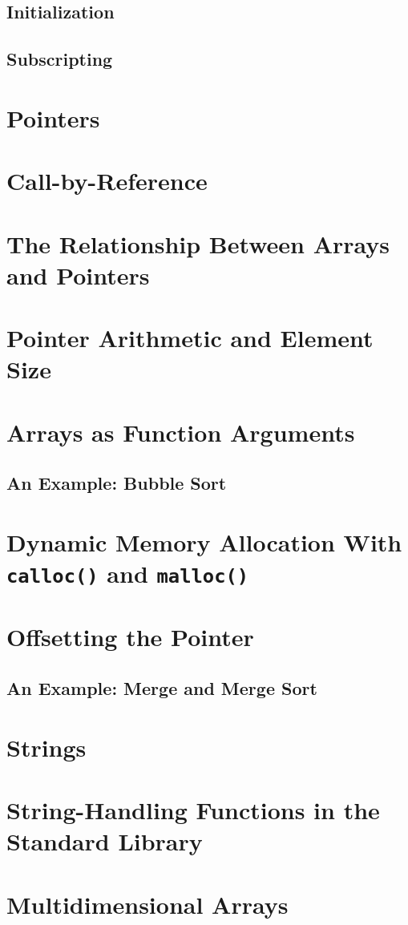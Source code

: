 \documentclass{article}
\begin{document}
\subsection{Initialization}
\subsection{Subscripting}
\section{Pointers}
\section{Call-by-Reference}
\section{The Relationship Between Arrays and Pointers}
\section{Pointer Arithmetic and Element Size}
\section{Arrays as Function Arguments}
\subsection{An Example: Bubble Sort}
\section{Dynamic Memory Allocation With \texttt{calloc()} and \texttt{malloc()}}
\section{Offsetting the Pointer}
\subsection{An Example: Merge and Merge Sort}
\section{Strings}
\section{String-Handling Functions in the Standard Library}
\section{Multidimensional Arrays}
\end{document}
